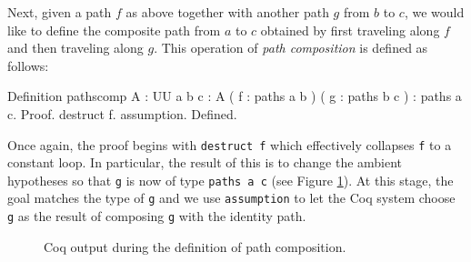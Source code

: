 Next, given a path $f$ as above together with another path $g$ from
$b$ to $c$, we would like to define the composite path from $a$ to $c$
obtained by first traveling along $f$ and then traveling along $g$.
This operation of \emph{path composition} is defined as follows:
\begin{center}
  \begin{coqcode}
Definition pathscomp { A : UU } { a b c : A } ( f : paths a b ) ( g : paths b c ) : paths a c.
Proof.
  destruct f. assumption.
Defined.
  \end{coqcode}
\end{center}
Once again, the proof begins with \verb|destruct f| which
effectively collapses \verb|f| to a constant loop.  In
particular, the result of this is to change the ambient hypotheses so
that \verb|g| is now of type \verb|paths a c| (see Figure
\ref{figure:pathscomp}).  At this stage, the goal matches the type of
\verb|g| and we use \verb|assumption| to let the Coq system
choose \verb|g| as the result of composing \verb|g| with the
identity path.
\begin{figure}[ht]
  \caption{Coq output during the definition of path composition.}
  \label{figure:pathscomp}
\end{figure}
